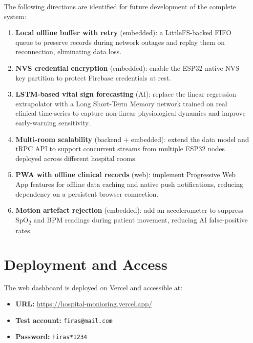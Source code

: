 The following directions are identified for future development of the complete system:

\begin{enumerate}
	\item \textbf{Local offline buffer with retry} (embedded): a LittleFS-backed
	      FIFO queue to preserve records during network outages and replay them on
	      reconnection, eliminating data loss.

	\item \textbf{NVS credential encryption} (embedded): enable the ESP32 native
	      NVS key partition to protect Firebase credentials at rest.

	\item \textbf{LSTM-based vital sign forecasting} (AI): replace the linear
	      regression extrapolator with a Long Short-Term Memory network trained on
	      real clinical time-series to capture non-linear physiological dynamics and
	      improve early-warning sensitivity.

	\item \textbf{Multi-room scalability} (backend + embedded): extend the data
	      model and tRPC API to support concurrent streams from multiple ESP32 nodes
	      deployed across different hospital rooms.

	\item \textbf{PWA with offline clinical records} (web): implement Progressive
	      Web App features for offline data caching and native push notifications,
	      reducing dependency on a persistent browser connection.

	\item \textbf{Motion artefact rejection} (embedded): add an accelerometer to
	      suppress SpO\textsubscript{2} and BPM readings during patient movement,
	      reducing AI false-positive rates.
\end{enumerate}

\section{Deployment and Access}

The web dashboard is deployed on Vercel\cite{vercel} and accessible at:
\begin{itemize}
	\item \textbf{URL:} \url{https://hospital-monioring.vercel.app/}
	\item \textbf{Test account:} \texttt{firas@mail.com}
	\item \textbf{Password:} \texttt{Firas*1234}
\end{itemize}
